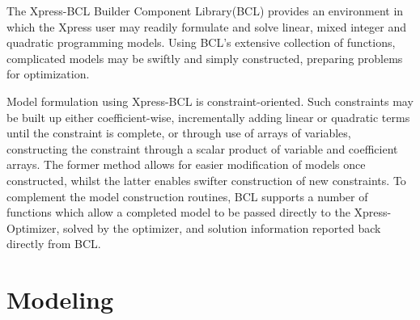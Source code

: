 \documentclass[a4paper, 12pt]{article}
\begin{document}
\noindent
The Xpress-BCL Builder Component Library(BCL) provides an environment in which the Xpress user may readily formulate and solve linear, mixed integer and quadratic programming models. Using BCL’s extensive collection of functions, complicated models may be swiftly and simply constructed, preparing problems for optimization.\\ \par
\noindent
Model formulation using Xpress-BCL is constraint-oriented. Such constraints may be built up either coefficient-wise, incrementally adding 
linear or quadratic terms until the constraint is complete, or through use of arrays of variables, constructing the constraint through a 
scalar product of variable and coefficient arrays. The former method allows for easier modification of models once constructed, whilst the 
latter enables swifter construction of new constraints. To complement the model construction routines, BCL supports a number of functions which allow a completed model to be passed directly to the Xpress-Optimizer, solved by the optimizer, and solution information reported back 
directly from BCL.
\newpage
\section{Modeling}
\end{document}
